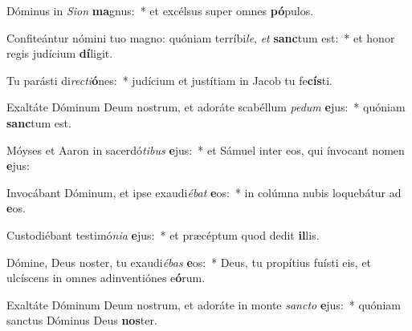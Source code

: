 \item Dóminus in \textit{Si}\textit{on} \textbf{ma}gnus:~* et excélsus super omnes \textbf{pó}pulos.
\item Confiteántur nómini tuo magno: quóniam terríbi\textit{le}, \textit{et} \textbf{sanc}tum est:~* et honor regis judícium \textbf{dí}ligit.
\item Tu parásti di\textit{rec}\textit{ti}\textbf{ó}nes:~* judícium et justítiam in Jacob tu fe\textbf{cís}ti.
\item Exaltáte Dóminum Deum nostrum, et adoráte scabéllum \textit{pe}\textit{dum} \textbf{e}jus:~* quóniam \textbf{sanc}tum est.
\item Móyses et Aaron in sacerdó\textit{ti}\textit{bus} \textbf{e}jus:~* et Sámuel inter eos, qui ínvocant nomen \textbf{e}jus:
\item Invocábant Dóminum, et ipse exaudi\textit{é}\textit{bat} \textbf{e}os:~* in colúmna nubis loquebátur ad \textbf{e}os.
\item Custodiébant testimó\textit{ni}\textit{a} \textbf{e}jus:~* et præcéptum quod dedit \textbf{il}lis.
\item Dómine, Deus noster, tu exaudi\textit{é}\textit{bas} \textbf{e}os:~* Deus, tu propítius fuísti eis, et ulcíscens in omnes adinventiónes e\textbf{ó}rum.
\item Exaltáte Dóminum Deum nostrum, et adoráte in monte \textit{sanc}\textit{to} \textbf{e}jus:~* quóniam sanctus Dóminus Deus \textbf{nos}ter.
